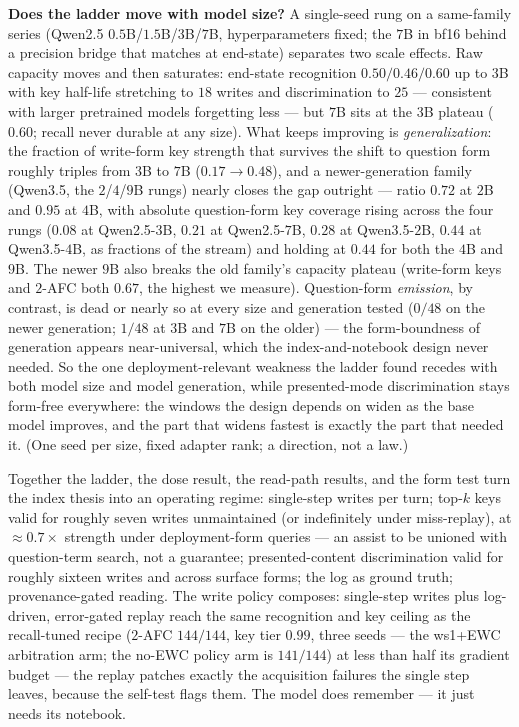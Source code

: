 \documentclass[11pt]{article}
\begin{document}
\textbf{Does the ladder move with model size?} A single-seed rung on a same-family series
(Qwen2.5 $0.5$B/$1.5$B/$3$B/$7$B, hyperparameters fixed; the $7$B in bf16 behind a precision
bridge that matches at end-state) separates two scale effects. Raw capacity moves and then
saturates: end-state recognition $0.50/0.46/0.60$ up to $3$B with key half-life stretching to
$18$ writes and discrimination to $25$ --- consistent with larger pretrained models forgetting
less \citep{ramasesh2022scale} --- but $7$B sits at the $3$B plateau ($0.60$; recall never
durable at any size). What keeps improving is \emph{generalization}: the fraction of write-form
key strength that survives the shift to question form roughly triples from $3$B to $7$B
($0.17 \to 0.48$), and a newer-generation family (Qwen3.5, the $2$/$4$/$9$B rungs) nearly
closes the gap outright --- ratio
$0.72$ at $2$B and $\mathbf{0.95}$ at $4$B, with absolute question-form key coverage rising
across the four rungs ($0.08$ at Qwen2.5-$3$B, $0.21$ at Qwen2.5-$7$B, $0.28$ at
Qwen3.5-$2$B, $0.44$ at Qwen3.5-$4$B, as fractions of the stream) and holding at $0.44$
for both the $4$B and $9$B. The newer $9$B also breaks the old family's capacity plateau
(write-form keys and $2$-AFC both $0.67$, the highest we measure). Question-form
\emph{emission}, by contrast, is dead or nearly so at every size and generation tested ($0/48$
on the newer generation; $1/48$ at $3$B and $7$B on the older) --- the
form-boundness of generation appears near-universal, which the index-and-notebook design never
needed. So the one deployment-relevant weakness the ladder found recedes with both model size
and model generation, while presented-mode discrimination stays form-free everywhere: the windows the design
depends on widen as the base model improves, and the part that widens fastest is exactly the
part that needed it. (One seed per size, fixed adapter rank; a direction, not a law.)

Together the ladder, the dose result, the read-path results, and the form test turn the index
thesis into an operating regime: single-step writes per turn; top-$k$ keys valid for roughly
seven writes unmaintained (or indefinitely under miss-replay), at $\approx 0.7\times$ strength
under deployment-form queries --- an assist to be unioned with question-term search, not a
guarantee; presented-content discrimination valid for roughly sixteen writes and across surface
forms; the log as ground truth; provenance-gated reading. The write policy composes: single-step
writes plus log-driven, error-gated replay reach the same recognition and key ceiling as the
recall-tuned recipe ($2$-AFC $144/144$, key tier $0.99$, three seeds --- the ws1+EWC
arbitration arm; the no-EWC policy arm is $141/144$) at less than half its
gradient budget --- the replay patches exactly the acquisition failures the single step leaves,
because the self-test flags them. The model does remember --- it just needs its notebook.
\end{document}
